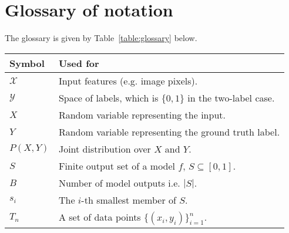 \newpage
\section{Glossary of notation}

The glossary is given by Table~\ref{table:glossary} below.

\begin{table*}[h]
\centering
\begin{tabular}{l l}
\toprule
Symbol & Used for \\
\midrule
$\mathcal{X}$ & Input features (e.g. image pixels). \\
$\mathcal{Y}$ & Space of labels, which is $\{0, 1\}$ in the two-label case. \\
$X$ & Random variable representing the input. \\
$Y$ & Random variable representing the ground truth label. \\
$P(X, Y)$ & Joint distribution over $X$ and $Y$. \\
$S$ & Finite output set of a model $f$, $S \subseteq [0, 1]$. \\
$B$ & Number of model outputs i.e. $|S|$. \\
$s_i$ & The $i$-th smallest member of $S$. \\
$T_n$ & A set of data points $\{(x_i, y_i)\}_{i=1}^n$. \\



\end{tabular}
\caption{
	Glossary of variables and symbols used in this paper.
}
\label{table:glossary}
\end{table*}
